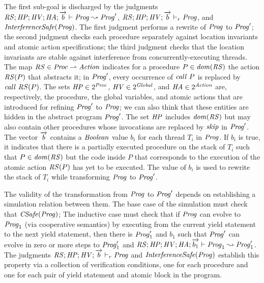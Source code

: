 The first sub-goal is discharged by 
the judgments $\mathit{RS};\mathit{HP};\mathit{HV};\mathit{HA};\overrightarrow{b} \vdash \mathit{Prog} \leadsto \mathit{Prog}'$,
$\mathit{RS};\mathit{HP};\mathit{HV};\overrightarrow{b} \vdash_r \mathit{Prog}$, and $\mathit{InterferenceSafe}(\mathit{Prog})$.
The first judgment performs a rewrite of $\mathit{Prog}$ to $\mathit{Prog}'$;
the second judgment checks each procedure separately against location invariants and atomic action specifications;
the third judgment checks that the location invariants are stable against interference from concurrently-executing threads.
The map $\mathit{RS} \in \mathit{Proc} \rightharpoonup \mathit{Action}$ indicates for a procedure $P \in \mathit{dom}(\mathit{RS})$ 
the action $\mathit{RS}(P)$ that abstracts it;
in $\mathit{Prog}'$, every occurrence of $\mathit{call}\ P$ is replaced by $\mathit{call}\ \mathit{RS}(P)$.
The sets $\mathit{HP} \in 2^{\mathit{Proc}}$, $\mathit{HV} \in 2^{\mathit{Global}}$, and $\mathit{HA} \in 2^{\mathit{Action}}$ 
are, respectively, the procedure, the global variables, and atomic actions 
that are introduced for refining $\mathit{Prog}'$ to $\mathit{Prog}$;
we can also think that these entities are hidden in the abstract program $\mathit{Prog}'$.
The set $\mathit{HP}$ includes $\mathit{dom}(\mathit{RS})$ but may also contain other procedures whose invocations 
are replaced by $\mathit{skip}$ in $\mathit{Prog}'$.
The vector $\overrightarrow{b}$ contains a $\mathit{Boolean}$ value $b_i$ for each thread $T_i$ in $\mathit{Prog}$.
If $b_i$ is true, it indicates that there is a partially executed procedure on the stack of $T_i$ 
such that $P \in \mathit{dom}(\mathit{RS})$ but the code inside $P$ that corresponds to the execution of the atomic action $\mathit{RS}(P)$
has yet to be executed.
The value of $b_i$ is used to rewrite the stack of $T_i$ while transforming $\mathit{Prog}$ to $\mathit{Prog}'$.

The validity of the transformation from $\mathit{Prog}$ to $\mathit{Prog}'$ depends on establishing a simulation relation between them.
The base case of the simulation must check that $\mathit{CSafe}(\mathit{Prog})$;
The inductive case must check that if $\mathit{Prog}$ can evolve to $\mathit{Prog}_1$ (via cooperative semantics)
by executing from the current yield statement to the next yield statement, 
then there is $\mathit{Prog}'_1$ and $b_1$ such that $\mathit{Prog}'$ can evolve in zero or more steps to $\mathit{Prog}'_1$ 
and $\mathit{RS};\mathit{HP};\mathit{HV};\mathit{HA};\overrightarrow{b_1} \vdash \mathit{Prog}_1 \leadsto \mathit{Prog}'_1$.
The judgments $\mathit{RS};\mathit{HP};\mathit{HV};\overrightarrow{b} \vdash_r \mathit{Prog}$ and $\mathit{InterferenceSafe}(\mathit{Prog})$ 
establish this property via a collection of verification conditions, one for each procedure and 
one for each pair of yield statement and atomic block in the program.

